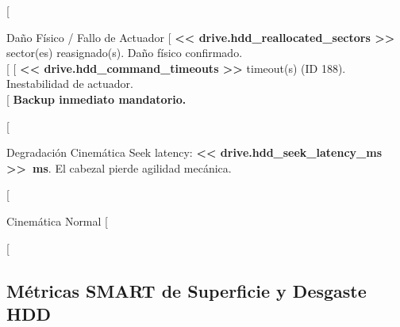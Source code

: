 \documentclass[11pt, a4paper, final]{article}
\newcommand{\mv}[1]{\textcolor{AMPrimary}{\textbf{#1}}}
\begin{document}
\begin{minipage}[t]{0.41\linewidth}
  \vspace{0pt}
  [%
  \begin{amboxcrit}{Daño Físico / Fallo de Actuador}
    \scriptsize
    [%
    \textbf{<< drive.hdd_reallocated_sectors >>} sector(es) reasignado(s). Daño físico confirmado.\\[3pt]
    [%
    [%
    \textbf{<< drive.hdd_command_timeouts >>} timeout(s) (ID 188). Inestabilidad de actuador.\\[3pt]
    [%
    \textbf{Backup inmediato mandatorio.}
  \end{amboxcrit}
  [%
  \begin{amboxwarn}{Degradación Cinemática}
    \scriptsize Seek latency: \mv{<< drive.hdd_seek_latency_ms >>\ ms}. El cabezal pierde agilidad mecánica.
  \end{amboxwarn}
  [%
  \begin{amboxok}{Cinemática Normal}
    \scriptsize [%
  \end{amboxok}
  [%
\end{minipage}

\vspace{0.5cm}

\subsection*{Métricas SMART de Superficie y Desgaste HDD}
\end{document}
